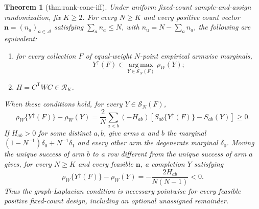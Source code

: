 \documentclass{article}
\newtheorem{theorem}{Theorem}
\begin{document}
\begin{theorem}[thm:rank-cone-iff]\label{thm:rank-cone-iff}
Under uniform fixed-count sample-and-assign randomization, fix \(K\geq2\).  For every \(N\geq K\) and every positive count vector \(\mathbf n=(n_a)_{a\in\mathcal A}\) satisfying \(\sum_a n_a\leq N\), with \(n_{\mathrm u}=N-\sum_a n_a\), the following are equivalent:
\begin{enumerate}
\item for every collection \(F\) of equal-weight \(N\)-point empirical armwise marginals,
\[
Y^{\uparrow}(F)\in\operatorname*{arg\,max}_{Y\in\mathcal S_N(F)}\rho_W(Y);
\]
\item \(H=C^{\mathsf T}WC\in\mathcal R_K\).
\end{enumerate}
When these conditions hold, for every \(Y\in\mathcal S_N(F)\),
\[
\rho_W\{Y^{\uparrow}(F)\}-\rho_W(Y)
=\frac{2}{N}\sum_{a<b}(-H_{ab})
\left[S_{ab}\{Y^{\uparrow}(F)\}-S_{ab}(Y)\right]\geq0.
\]
If \(H_{ab}>0\) for some distinct \(a,b\), give arms \(a\) and \(b\) the marginal \((1-N^{-1})\delta_0+N^{-1}\delta_1\) and every other arm the degenerate marginal \(\delta_0\).  Moving the unique success of arm \(b\) to a row different from the unique success of arm \(a\) gives, for every \(N\geq K\) and every feasible \(\mathbf n\), a completion \(Y\) satisfying
\[
\rho_W\{Y^{\uparrow}(F)\}-\rho_W(Y)
=-\frac{2H_{ab}}{N(N-1)}<0.
\]
Thus the graph-Laplacian condition is necessary pointwise for every feasible positive fixed-count design, including an optional unassigned remainder.
\end{theorem}
\end{document}
